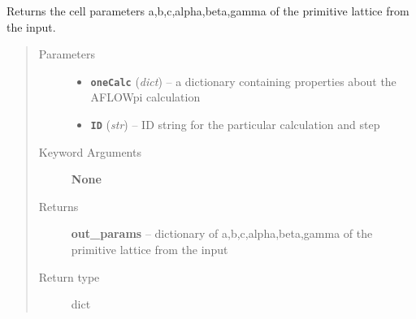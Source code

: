 \documentclass[letterpaper,10pt,english]{sphinxmanual}
\begin{document}
\begin{fulllineitems}
\label{retr:retr.__getInputParams}
Returns the cell parameters a,b,c,alpha,beta,gamma of the primitive lattice from the input.
\begin{quote}\begin{description}
\item[{Parameters}] \leavevmode\begin{itemize}
\item {} 
\textbf{\texttt{oneCalc}} (\emph{dict}) -- a dictionary containing properties about the AFLOWpi calculation

\item {} 
\textbf{\texttt{ID}} (\emph{str}) -- ID string for the particular calculation and step

\end{itemize}

\item[{Keyword Arguments}] \leavevmode
\textbf{None}

\item[{Returns}] \leavevmode
\textbf{out\_params} --
dictionary of a,b,c,alpha,beta,gamma of the primitive lattice from the input

\item[{Return type}] \leavevmode
dict

\end{description}\end{quote}

\end{fulllineitems}

\end{document}
